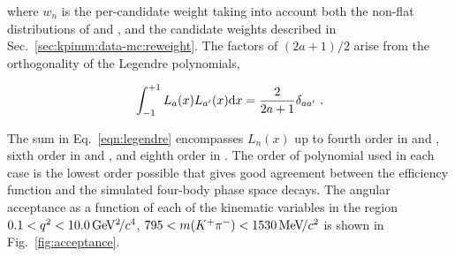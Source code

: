 \noindent where $w_{n}$ is the per-candidate weight taking into account both the non-flat distributions of \qsq and \mkpi, and the candidate weights described in Sec.~\ref{sec:kpimm:data-mc:reweight}. The factors of $(2a + 1)/2$ arise from the orthogonality of the Legendre polynomials,
 
\begin{equation}
\int_{-1}^{+1} L_{a}(x) L_{a'}(x) \mathrm{d} x = \frac{2}{2 a + 1}\delta_{ a a'}  ~.
\end{equation}

 The sum in Eq.~\ref{eqn:legendre} encompasses $L_n(x)$ up to fourth order in \ctl and \mkpip, sixth order in \phip and \qsqp, and eighth order in \ctk. The order of polynomial used in each case is the lowest order possible that gives good agreement between the efficiency function and the simulated four-body \BdToKpimm phase space decays. The angular acceptance as a function of each of the kinematic variables in the region $0.1<{q^2}<10.0{\mathrm{\,Ge\kern -0.1em V^2\!/}c^4}$, $795<m({{K}^+}{{\pi}^-})<1530{\mathrm{\,Me\kern -0.1em V\!/}c^2}$ is shown in Fig.~\ref{fig:acceptance}.

